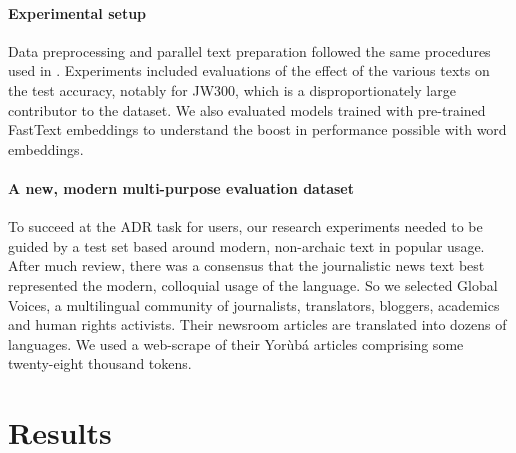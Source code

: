 \documentclass{article} %
\begin{document}
\paragraph{Experimental setup}\label{sec:experimental}
Data preprocessing and parallel text preparation followed the same procedures used in \citep{orife2018adr}. Experiments included evaluations of the effect of the various texts on the test accuracy, notably for JW300, which is a disproportionately large contributor to the dataset. We also evaluated models trained with pre-trained FastText embeddings to understand the boost in performance possible with word embeddings.

\paragraph{A new, modern multi-purpose evaluation dataset}\label{sec:evaldataset}
To succeed at the ADR task for users, our research experiments needed to be guided by a test set based around modern, non-archaic text in popular usage. After much review, there was a consensus that the journalistic news text best represented the modern, colloquial usage of the language. So we selected Global Voices, a multilingual community of journalists, translators, bloggers, academics and human rights activists. Their newsroom articles are translated into dozens of languages. We used a web-scrape of their Yor{\`u}b{\'a} articles comprising some twenty-eight thousand tokens.



\section{Results}\label{sec:results}
\end{document}
